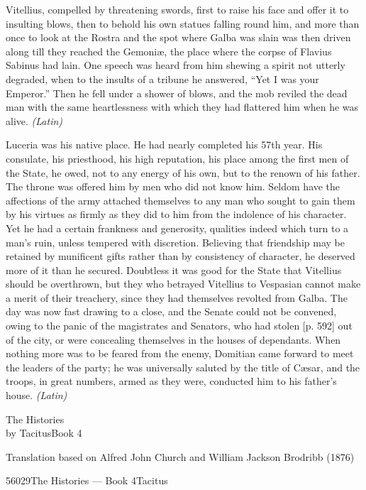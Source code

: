 
Vitellius, compelled by threatening swords, first to raise his face and offer it to insulting blows, then to behold his own statues falling round him, and more than once to look at the Rostra and the spot where Galba was slain was then driven along till they reached the Gemoniæ, the place where the corpse of Flavius Sabinus had lain. One speech was heard from him shewing a spirit not utterly degraded, when to the insults of a tribune he answered, ``Yet I was your Emperor.'' Then he fell under a shower of blows, and the mob reviled the dead man with the same heartlessness with which they had flattered him when he was alive. \emph{(Latin)}


Luceria was his native place. He had nearly completed his 57th year. His consulate, his priesthood, his high reputation, his place among the first men of the State, he owed, not to any energy of his own, but to the renown of his father. The throne was offered him by men who did not know him. Seldom have the affections of the army attached themselves to any man who sought to gain them by his virtues as firmly as they did to him from the indolence of his character. Yet he had a certain frankness and generosity, qualities indeed which turn to a man's ruin, unless tempered with discretion. Believing that friendship may be retained by munificent gifts rather than by consistency of character, he deserved more of it than he secured. Doubtless it was good for the State that Vitellius should be overthrown, but they who betrayed Vitellius to Vespasian cannot make a merit of their treachery, since they had themselves revolted from Galba. The day was now fast drawing to a close, and the Senate could not be convened, owing to the panic of the magistrates and Senators, who had stolen [p. 592] out of the city, or were concealing themselves in the houses of dependants. When nothing more was to be feared from the enemy, Domitian came forward to meet the leaders of the party; he was universally saluted by the title of Cæsar, and the troops, in great numbers, armed as they were, conducted him to his father's house. \emph{(Latin)}


The Histories\\
by TacitusBook 4

Translation based on Alfred John Church and William Jackson Brodribb (1876)

56029The Histories — Book 4Tacitus

